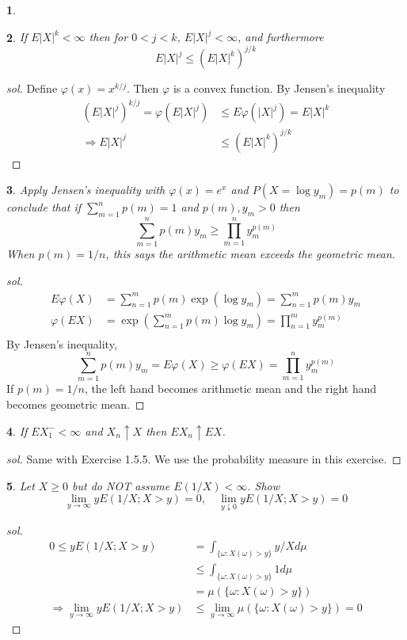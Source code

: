 \documentclass{report}
\newtheorem{ex}{}[section]
\begin{document}
\begin{ex}
\end{ex}
\begin{ex}
If $E|X|^k < \infty$ then for $0 < j < k$, $E|X|^j < \infty$, and furthermore
\[E|X|^j \le (E|X|^k)^{j/k}\]
\end{ex}
\begin{proof}[sol]
Define $\varphi(x) = x ^{k/j}$. Then $\varphi$ is a convex function. By Jensen's inequality
\begin{align*}
    (E|X|^j)^{k/j} = \varphi(E|X|^j) &\le E\varphi(|X|^j) = E|X|^k\\
    \Rightarrow E|X|^j &\le (E|X|^k)^{j/k}
\end{align*}
\end{proof}
\begin{ex}
Apply Jensen's inequality with $\varphi(x) = e^x$ and $P(X = \log y_m) = p(m)$ to conclude that if $\sum_{m=1}^n p(m) = 1$ and $p(m), y_m > 0$ then
\[\sum_{m=1}^n p(m)y_m \ge \prod_{m=1}^n y_m^{p(m)}\]
When $p(m) = 1/n$, this says the arithmetic mean exceeds the geometric mean.
\end{ex}
\begin{proof}[sol]
\begin{align*}
E\varphi(X) &= \sum_{n=1}^m p(m) \exp(\log y_m) = \sum_{n=1}^m p(m)y_m\\
\varphi(EX) &= \exp(\sum_{n=1}^m p(m)\log y_m) = \prod_{n=1}^m y_m^{p(m)}\\
\end{align*}
By Jensen's inequality,
\[\sum_{m=1}^n p(m)y_m  = E\varphi(X) \ge \varphi(EX) = \prod_{m=1}^n y_m^{p(m)}\]
If $p(m) = 1/n$, the left hand becomes arithmetic mean and the right hand becomes geometric mean.
\end{proof}
\begin{ex}
If $EX_1^- <\infty$ and $X_n \uparrow X$ then $EX_n \uparrow EX$.
\end{ex}
\begin{proof}[sol]
Same with Exercise 1.5.5. We use the probability measure in this exercise.
\end{proof}
\begin{ex}
Let $X \ge 0 $ but do NOT assume $E(1/X) < \infty$. Show
\[\lim_{y\to\infty} yE(1/X; X>y) = 0,\quad \lim_{y\downarrow 0} yE(1/X; X>y) = 0\]
\end{ex}
\begin{proof}[sol]
\begin{align*}
    0 \le yE(1/X;X>y) &= \int_{\{\omega : X(\omega) > y\}} y/X d\mu\\
    &\le \int_{\{\omega : X(\omega) > y\}} 1d\mu\\
    &= \mu(\{\omega : X(\omega) > y\})\\
    \Rightarrow\lim_{y\to\infty} yE(1/X; X>y) &\le \lim_{y\to\infty}\mu(\{\omega : X(\omega) > y\}) = 0
\end{align*}
\end{proof}
\end{document}
